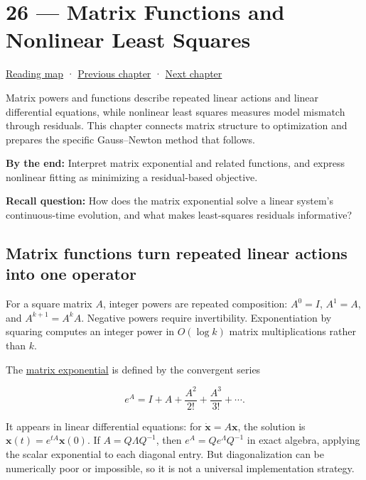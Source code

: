 \hypertarget{02-foundations-ii-ch026}{}
\section{26 --- Matrix Functions and Nonlinear Least Squares}\label{matrix-functions-and-nonlinear-least-squares}

\href{Chapter\%20Edition/01\%20-\%20Computing\%20Foundations/00\%20-\%20Reading\%20Map}{Reading map} · \hyperref[02-foundations-ii-ch025]{Previous chapter} · \hyperref[02-foundations-ii-ch027]{Next chapter}

Matrix powers and functions describe repeated linear actions and linear differential equations, while nonlinear least squares measures model mismatch through residuals. This chapter connects matrix structure to optimization and prepares the specific Gauss--Newton method that follows.

\textbf{By the end:} Interpret matrix exponential and related functions, and express nonlinear fitting as minimizing a residual-based objective.

\textbf{Recall question:} How does the matrix exponential solve a linear system's continuous-time evolution, and what makes least-squares residuals informative?

\subsection{Matrix functions turn repeated linear actions into one operator}\label{matrix-functions-turn-repeated-linear-actions-into-one-operator}

For a square matrix \(A\), integer powers are repeated composition: \(A^0=I\), \(A^1=A\), and \(A^{k+1}=A^kA\). Negative powers require invertibility. Exponentiation by squaring computes an integer power in \(O(\log k)\) matrix multiplications rather than \(k\).

The \hyperref[02-foundations-ii-ch026]{matrix exponential} is defined by the convergent series

\[
e^A=I+A+\frac{A^2}{2!}+\frac{A^3}{3!}+\cdots.
\]

It appears in linear differential equations: for \(\dot{\mathbf x}=A\mathbf x\), the solution is \(\mathbf x(t)=e^{tA}\mathbf x(0)\). If \(A=Q\Lambda Q^{-1}\), then \(e^A=Qe^\Lambda Q^{-1}\) in exact algebra, applying the scalar exponential to each diagonal entry. But diagonalization can be numerically poor or impossible, so it is not a universal implementation strategy.

